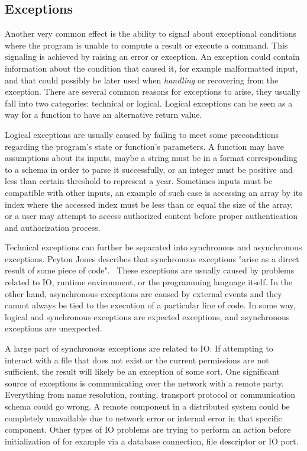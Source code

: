 \subsection{Exceptions} \label{effects:exceptions}
Another very common effect is the ability to signal about exceptional conditions where the program is unable to compute a result or execute a command. This signaling is achieved by raising an error or exception. An exception could contain information about the condition that caused it, for example malformatted input, and that could possibly be later used when \textit{handling} or recovering from the exception. There are several common reasons for exceptions to arise, they usually fall into two categories: technical or logical. Logical exceptions can be seen as a way for a function to have an alternative return value.~\cite{imprecise-exceptions}

Logical exceptions are usually caused by failing to meet some preconditions regarding the program's state or function's parameters. A function may have assumptions about its inputs, maybe a string must be in a format corresponding to a schema in order to parse it successfully, or an integer must be positive and less than certain threshold to represent a year. Sometimes inputs must be compatible with other inputs, an example of such case is accessing an array by its index where the accessed index must be less than or equal the size of the array, or a user may attempt to access authorized content before proper authentication and authorization process.

Technical exceptions can further be separated into synchronous and asynchronous exceptions. Peyton Jones describes that synchronous exceptions "arise as a direct result of some piece of code".~\cite{akward-squad} These exceptions are usually caused by problems related to IO, runtime environment, or the programming language itself. In the other hand, asynchronous exceptions are caused by external events and they cannot always be tied to the execution of a particular line of code. In some way, logical and synchronous exceptions are expected exceptions, and asynchronous exceptions are unexpected.

A large part of synchronous exceptions are related to IO. If attempting to interact with a file that does not exist or the current permissions are not sufficient, the result will likely be an exception of some sort. One significant source of exceptions is communicating over the network with a remote party. Everything from name resolution, routing, transport protocol or communication schema could go wrong. A remote component in a distributed system could be completely unavailable due to network error or internal error in that specific component. Other types of IO problems are trying to perform an action before initialization of for example via a database connection, file descriptor or IO port.

